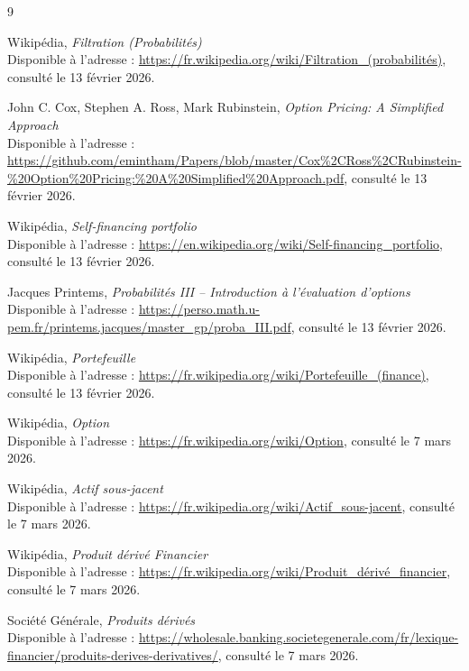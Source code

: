 \begin{thebibliography}{9}

    Wikipédia, \emph{Filtration (Probabilités)}\\
    Disponible à l'adresse :  
    \url{https://fr.wikipedia.org/wiki/Filtration_(probabilités)}, 
    consulté le 13 février 2026. 

    John C. Cox, Stephen A. Ross, Mark Rubinstein, \emph{Option Pricing: A Simplified Approach}\\
    Disponible à l'adresse :  
    \url{https://github.com/emintham/Papers/blob/master/Cox%2CRoss%2CRubinstein-%20Option%20Pricing:%20A%20Simplified%20Approach.pdf}, 
    consulté le 13 février 2026.

    Wikipédia, \emph{Self-financing portfolio}\\
    Disponible à l'adresse :  
    \url{https://en.wikipedia.org/wiki/Self-financing_portfolio}, 
    consulté le 13 février 2026.

    Jacques Printems, \emph{Probabilités III – Introduction à l’évaluation d’options}\\
    Disponible à l'adresse :  
    \url{https://perso.math.u-pem.fr/printems.jacques/master_gp/proba_III.pdf}, 
    consulté le 13 février 2026.

    Wikipédia, \emph{Portefeuille}\\
    Disponible à l'adresse :  
    \url{https://fr.wikipedia.org/wiki/Portefeuille_(finance)}, 
    consulté le 13 février 2026.

    Wikipédia, \emph{Option}\\
    Disponible à l'adresse :  
    \url{https://fr.wikipedia.org/wiki/Option}, 
    consulté le 7 mars 2026.

    Wikipédia, \emph{Actif sous-jacent}\\
    Disponible à l'adresse :  
    \url{https://fr.wikipedia.org/wiki/Actif_sous-jacent}, 
    consulté le 7 mars 2026.

    Wikipédia, \emph{Produit dérivé Financier}\\
    Disponible à l'adresse :  
    \url{https://fr.wikipedia.org/wiki/Produit_dérivé_financier}, 
    consulté le 7 mars 2026.

    Société Générale, \emph{Produits dérivés}\\
    Disponible à l'adresse :  
    \url{https://wholesale.banking.societegenerale.com/fr/lexique-financier/produits-derives-derivatives/}, 
    consulté le 7 mars 2026.


\end{thebibliography}
